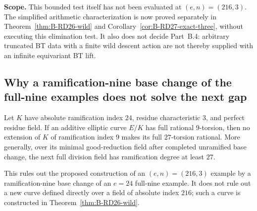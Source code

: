 \par\smallskip\noindent\textbf{Scope.}
This bounded test itself has not been evaluated at $(e,n)=(216,3)$. The simplified arithmetic characterization is now proved separately in Theorem~\ref{thm:B-RD26-wild} and Corollary~\ref{cor:B-RD27-exact-three}, without executing this elimination test.  It also does not decide Part~B.4: arbitrary truncated BT data with a finite wild descent action are not thereby supplied with an infinite equivariant BT lift.


\subsection{Why a ramification-nine base change of the full-nine examples does not solve the next gap}

\begin{proposition}\label{prop:B-RD25-basechange-obstruction}
Let $K$ have absolute ramification index $24$, residue characteristic $3$, and perfect residue field.  If an additive elliptic curve $E/K$ has full rational $9$-torsion, then no extension of $K$ of ramification index $9$ makes its full $27$-torsion rational.  More generally, over its minimal good-reduction field after completed unramified base change, the next full division field has ramification degree at least $27$.

This rules out the proposed construction of an $(e,n)=(216,3)$ example by a ramification-nine base change of an $e=24$ full-nine example.  It does not rule out a new curve defined directly over a field of absolute index $216$; such a curve is constructed in Theorem~\ref{thm:B-RD26-wild}.
\end{proposition}
